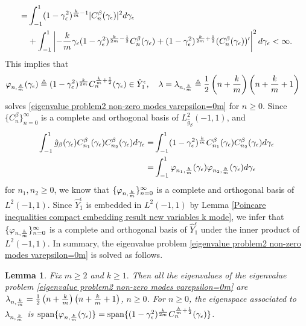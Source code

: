 \documentclass[1 [leqno, 11pt]{amsart}
\numberwithin{equation}{section}
\let\ep=\epsilon
\newtheorem{lemma}[Theorem]{Lemma}
\begin{document}
\begin{CJK*}{GBK}{song}
\begin{align}
=&\int_{-1}^1(1-\gamma_\ep^2)^{{k\over m}-1}|C_n^\beta(\gamma_\ep)|^2d\gamma_\ep\\
&+\int_{-1}^1\left|-{k\over m}\gamma_\ep(1-\gamma_\ep^2)^{{k\over 2m}-{1\over2}} C_n^\beta(\gamma_\ep)+(1-\gamma_\ep^2)^{{k\over 2m}+{1\over2}}(C_n^\beta(\gamma_\ep))'\right|^2d\gamma_\ep
<\infty.\label{1-gammacnykep}
\end{align}
This implies that
\begin{align*}
&\varphi_{n,{k\over m}}(\gamma_\ep)\triangleq(1-\gamma_\ep^2)^{k\over2m}C_n^{{k\over m}+{1\over2}}(\gamma_\ep)\in\hat Y_1^\ep,\quad\lambda=\lambda_{n,{k\over m}}\triangleq{1\over2}\left(n+{k\over m}\right)\left(n+{k\over m} +1\right)
\end{align*}
solves \eqref{eigenvalue problem2 non-zero modes varepsilon=0m} for $n\geq0$.
Since $\{C_n^\beta\}_{n=0}^\infty$ is a complete and  orthogonal basis of $ L_{\hat g_\beta}^2(-1,1)$, and
\begin{align*}
\int_{-1}^1\hat g_\beta(\gamma_\ep) C_{n_1}^\beta (\gamma_\ep)C_{n_2}^\beta (\gamma_\ep) d\gamma_\ep=&\int_{-1}^1(1-\gamma_\ep^2)^{k\over m}C_{n_1}^\beta (\gamma_\ep)C_{n_2}^\beta (\gamma_\ep) d\gamma_\ep \\
=&\int_{-1}^1\varphi_{n_1,{k\over m}}(\gamma_\ep)\varphi_{n_2,{k\over m}}(\gamma_\ep)  d\gamma_\ep
\end{align*}
for $n_1,n_2\geq0$, we know that  $\{\varphi_{n,{k\over m}}\}_{n=0}^\infty$ is a complete and  orthogonal basis of $ L^2(-1,1)$.
Since $\hat Y_1^\ep$ is embedded in $ L^2(-1,1)$ by Lemma
\ref{Poincare inequalities compact embedding result new variables k mode}, we infer that
$\{\varphi_{n,{k\over m}}\}_{n=0}^\infty$ is a complete and  orthogonal basis of $\hat Y_1^\ep$ under the inner product of $ L^2(-1,1)$.
In summary, the eigenvalue problem \eqref{eigenvalue problem2 non-zero modes varepsilon=0m} is solved as follows.

\begin{lemma}\label{sol to eigenvalue problem non-zero modes varepsilon=0} Fix $m\geq2$ and $k\geq1.$ Then
all the eigenvalues  of the eigenvalue problem \eqref{eigenvalue problem2 non-zero modes varepsilon=0m} are $\lambda_{n,{k\over m}}={1\over2}\left(n+{k\over m}\right)\left(n+{k\over m} +1\right)$, $n\geq 0$. For $n\geq0$, the eigenspace associated to $\lambda_{n,{k\over m}}$ is $\text{span}\{\varphi_{n,{k\over m}}(\gamma_\ep)\}=\text{span}\{(1-\gamma_\ep^2)^{k\over2m}C_n^{{k\over m}+{1\over2}}(\gamma_\ep)\}$.
\end{lemma}


\end{CJK*}
\end{document}
